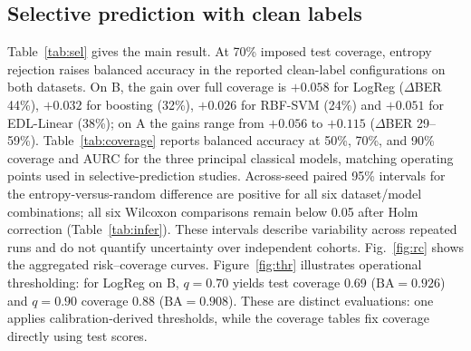 \documentclass[conference]{IEEEtran}
\newcommand{\BA}{\mathrm{BA}}
\begin{document}
\subsection{Selective prediction with clean labels}
Table~\ref{tab:sel} gives the main result. At 70\% imposed test coverage, entropy rejection raises balanced accuracy in the reported clean-label configurations on both datasets. On B, the gain over full coverage is $+0.058$ for LogReg ($\Delta$BER 44\%), $+0.032$ for boosting (32\%), $+0.026$ for RBF-SVM (24\%) and $+0.051$ for EDL-Linear (38\%); on A the gains range from $+0.056$ to $+0.115$ ($\Delta$BER 29--59\%). Table~\ref{tab:coverage} reports balanced accuracy at 50\%, 70\%, and 90\% coverage and AURC for the three principal classical models, matching operating points used in selective-prediction studies. Across-seed paired 95\% intervals for the entropy-versus-random difference are positive for all six dataset/model combinations; all six Wilcoxon comparisons remain below 0.05 after Holm correction (Table~\ref{tab:infer}). These intervals describe variability across repeated runs and do not quantify uncertainty over independent cohorts. Fig.~\ref{fig:rc} shows the aggregated risk--coverage curves. Figure~\ref{fig:thr} illustrates operational thresholding: for LogReg on B, $q=0.70$ yields test coverage 0.69 ($\BA=0.926$) and $q=0.90$ coverage 0.88 ($\BA=0.908$). These are distinct evaluations: one applies calibration-derived thresholds, while the coverage tables fix coverage directly using test scores.

\begin{table}[t]
\centering\caption{Selective prediction with clean labels at 70\% imposed coverage (mean over seeds; best BA$_{0.7}$ and AURC per dataset in bold). $\Delta$BER: relative balanced-error reduction. H: entropy; $u$: evidential mass; MI: ensemble mutual information.}\label{tab:sel}
\scriptsize\resizebox{\textwidth}{!}{}
\end{table}

\begin{table}[t]
\centering\caption{Balanced accuracy at several fixed test coverages and AURC for the three principal entropy-based classifiers (mean $\pm$ s.d. across seeds).}\label{tab:coverage}
\small
\end{table}

\begin{table}[t]
\centering\caption{Primary paired comparison of entropy rejection with random rejection at 70\% coverage. $\Delta$BA is entropy minus random; intervals are paired 95\% Student-$t$ intervals across seeds. Holm adjustment is applied to this six-test family.}\label{tab:infer}
\small
\end{table}
\end{document}
